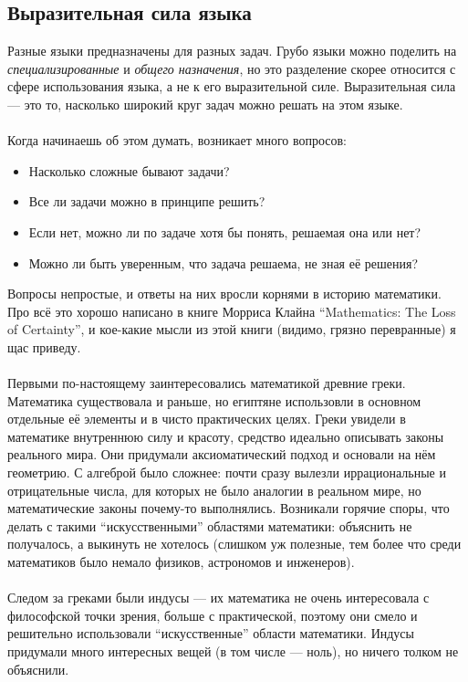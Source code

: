 \documentclass[11pt]{book}
\begin{document}
\subsection{Выразительная сила языка}
Разные языки предназначены для разных задач.
Грубо языки можно поделить на \emph{специализированные} и \emph{общего назначения},
но это разделение скорее относится с сфере использования языка, а не к его выразительной силе.
Выразительная сила --- это то, насколько широкий круг задач можно решать на этом языке.
\\ \\
Когда начинаешь об этом думать, возникает много вопросов:
\begin{itemize}
\item Насколько сложные бывают задачи?
\item Все ли задачи можно в принципе решить?
\item Если нет, можно ли по задаче хотя бы понять, решаемая она или нет?
\item Можно ли быть уверенным, что задача решаема, не зная её решения?
\end{itemize}
Вопросы непростые, и ответы на них вросли корнями в историю математики.
Про всё это хорошо написано в книге Морриса Клайна ``Mathematics: The Loss of Certainty'',
и кое-какие мысли из этой книги (видимо, грязно перевранные) я щас приведу.
\\ \\
Первыми по-настоящему заинтересовались математикой древние греки.
Математика существовала и раньше, но египтяне использовли в основном отдельные её элементы и в чисто практических целях.
Греки увидели в математике внутреннюю силу и красоту, средство идеально описывать законы реального мира.
Они придумали аксиоматический подход и основали на нём геометрию.
С алгеброй было сложнее: почти сразу вылезли иррациональные и отрицательные числа,
для которых не было аналогии в реальном мире, но математические законы почему-то выполнялись.
Возникали горячие споры, что делать с такими ``искусственными'' областями математики:
объяснить не получалось, а выкинуть не хотелось (слишком уж полезные, тем более что среди математиков было немало физиков, астрономов и инженеров).
\\ \\
Следом за греками были индусы --- их математика не очень интересовала с философской точки зрения, больше с практической,
поэтому они смело и решительно использовали ``искусственные'' области математики.
Индусы придумали много интересных вещей (в том числе --- ноль), но ничего толком не объяснили.
\end{document}
